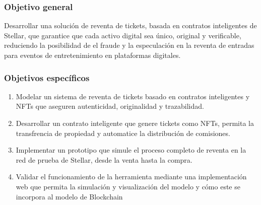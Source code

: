 \documentclass[12pt,a4paper]{article}
\begin{document}
\subsubsection{Objetivo general}
Desarrollar una solución de reventa de tickets, basada en contratos inteligentes de Stellar, que garantice que cada activo digital sea único, original y verificable, reduciendo la posibilidad de el fraude y la especulación en la reventa de entradas para eventos de entretenimiento en plataformas digitales.

\subsubsection{Objetivos específicos}
\begin{enumerate}[noitemsep]
	\item Modelar un sistema de reventa de tickets basado en contratos inteligentes y NFTs que aseguren autenticidad, originalidad y trazabilidad. 

	\item Desarrollar un contrato inteligente que genere tickets como NFTs, permita la transfrencia de propiedad y automatice la distribución de comisiones. 
	 
	\item Implementar un prototipo que simule el proceso completo de reventa en la red de prueba de Stellar, desde la venta hasta la compra.
	
	\item Validar el funcionamiento de la herramienta mediante una implementación web que permita la simulación y visualización del modelo y cómo este se incorpora al modelo de Blockchain
	
\end{enumerate}
\end{document}

